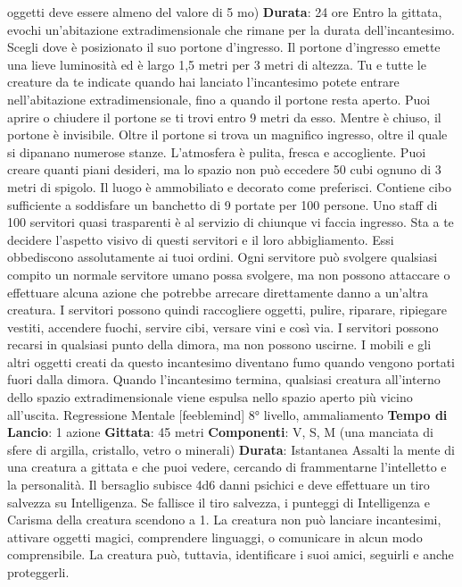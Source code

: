 \begin{multicols}{2}
oggetti deve essere almeno del valore di 5 mo)
\textbf{Durata}: 24 ore
Entro la gittata, evochi un’abitazione extradimensionale
che rimane per la durata dell’incantesimo. Scegli dove è
posizionato il suo portone d’ingresso. Il portone
d’ingresso emette una lieve luminosità ed è largo 1,5
metri per 3 metri di altezza. Tu e tutte le creature da te
indicate quando hai lanciato l’incantesimo potete
entrare nell’abitazione extradimensionale, fino a quando
il portone resta aperto. Puoi aprire o chiudere il portone
se ti trovi entro 9 metri da esso. Mentre è chiuso, il
portone è invisibile.
Oltre il portone si trova un magnifico ingresso, oltre il
quale si dipanano numerose stanze. L’atmosfera è
pulita, fresca e accogliente.
Puoi creare quanti piani desideri, ma lo spazio non può
eccedere 50 cubi ognuno di 3 metri di spigolo. Il luogo è
ammobiliato e decorato come preferisci. Contiene cibo
sufficiente a soddisfare un banchetto di 9 portate per
100 persone. Uno staff di 100 servitori quasi trasparenti
è al servizio di chiunque vi faccia ingresso. Sta a te
decidere l’aspetto visivo di questi servitori e il loro
abbigliamento. Essi obbediscono assolutamente ai tuoi
ordini. Ogni servitore può svolgere qualsiasi compito un
normale servitore umano possa svolgere, ma non
possono attaccare o effettuare alcuna azione che
potrebbe arrecare direttamente danno a un’altra
creatura. I servitori possono quindi raccogliere oggetti,
pulire, riparare, ripiegare vestiti, accendere fuochi,
servire cibi, versare vini e così via. I servitori possono
recarsi in qualsiasi punto della dimora, ma non possono
uscirne. I mobili e gli altri oggetti creati da questo
incantesimo diventano fumo quando vengono portati
fuori dalla dimora. Quando l’incantesimo termina,
qualsiasi creatura all’interno dello spazio
extradimensionale viene espulsa nello spazio aperto più
vicino all’uscita.
Regressione Mentale
[feeblemind]
8° livello, ammaliamento
\textbf{Tempo di Lancio}: 1 azione
\textbf{Gittata}: 45 metri
\textbf{Componenti}: V, S, M (una manciata di sfere di argilla,
cristallo, vetro o minerali)
\textbf{Durata}: Istantanea
Assalti la mente di una creatura a gittata e che puoi
vedere, cercando di frammentarne l’intelletto e la
personalità. Il bersaglio subisce 4d6 danni psichici e
deve effettuare un tiro salvezza su Intelligenza.
Se fallisce il tiro salvezza, i punteggi di Intelligenza e
Carisma della creatura scendono a 1. La creatura non
può lanciare incantesimi, attivare oggetti magici,
comprendere linguaggi, o comunicare in alcun modo
comprensibile. La creatura può, tuttavia, identificare i
suoi amici, seguirli e anche proteggerli.

\end{multicols}
